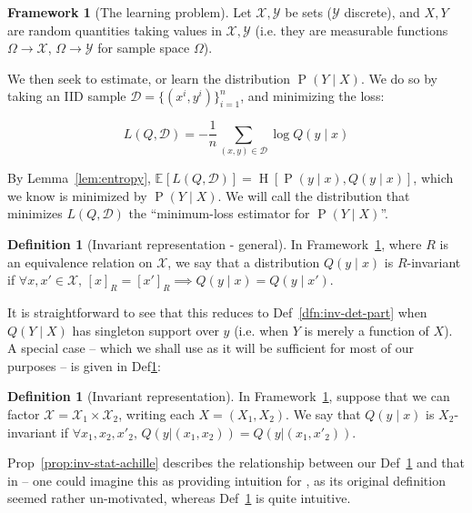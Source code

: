 \documentclass[12pt]{article}
\newcommand{\Ent}[1]{\operatorname{H}\left[#1\right]}
\newcommand{\E}[2][{}]{\mathbb{E}_{#1}\left[#2\right]}
\newcommand{\Prob}[1]{\operatorname{P}\left(#1\right)}
\theoremstyle{definition}
\newtheorem{dfn}[thm]{Definition}
\newtheorem{fw}[thm]{Framework}
\numberwithin{equation}{section}
\numberwithin{figure}{section}
\numberwithin{table}{section}
\begin{document}
\begin{fw}[The learning problem]
    \label{fw}
    Let $\mathcal{X},\mathcal{Y}$ be sets ($\mathcal{Y}$ discrete), and $X,Y$ are random quantities taking values in $\mathcal{X},\mathcal{Y}$ (i.e. they are measurable functions $\Omega\to\mathcal{X}$, $\Omega\to\mathcal{Y}$ for sample space $\Omega$).
    
    We then seek to estimate, or learn the distribution $\Prob{Y\mid X}$. We do so by taking an IID sample $\mathcal{D}=\{(x^i,y^i)\}_{i=1}^n$, and minimizing the loss:
    
    \begin{equation*}
        L(Q,\mathcal{D}) = -\frac1n \sum_{(x,y)\in\mathcal{D}}{\log Q(y\mid x)}
    \end{equation*}
    
    By Lemma~\ref{lem:entropy}, $\E{L(Q,\mathcal{D})}=\Ent{\Prob{y\mid x},Q(y\mid x)}$, which we know is minimized by $\Prob{Y\mid X}$. We will call the distribution that minimizes $L(Q,\mathcal{D})$ the ``minimum-loss estimator for $\Prob{Y\mid X}$''.
\end{fw}

\begin{dfn}[Invariant representation - general]
    \label{dfn:inv-representation1}
    In Framework~\ref{fw}, where $R$ is an equivalence relation on $\mathcal{X}$, we say that a distribution $Q(y\mid x)$ is $R$-invariant if $\forall x,x'\in\mathcal{X}, \, [x]_R=[x']_R \implies Q(y\mid x) = Q(y\mid x')$. 
\end{dfn}

It is straightforward to see that this reduces to Def~\ref{dfn:inv-det-part} when $Q(Y\mid X)$ has singleton support over $y$ (i.e. when $Y$ is merely a function of $X$). A special case -- which we shall use as it will be sufficient for most of our purposes -- is given in Def\ref{dfn:inv-representation}:

\begin{dfn}[Invariant representation]
    \label{dfn:inv-representation}
        In Framework~\ref{fw}, suppose that we can factor $\mathcal{X} = \mathcal{X}_1 \times \mathcal{X}_2$, writing each $X=(X_1,X_2)$. We say that $Q(y\mid x)$ is $X_2$-invariant if $\forall x_1, x_2, x'_2, \, Q(y|(x_1,x_2))=Q(y|(x_1,x'_2))$.
\end{dfn}

Prop~\ref{prop:inv-stat-achille} describes the relationship between our Def~\ref{dfn:inv-representation} and that in \cite{achille} -- one could imagine this as providing intuition for \cite{achille}, as its original definition seemed rather un-motivated, whereas Def~\ref{dfn:inv-representation} is quite intuitive.
\end{document}
